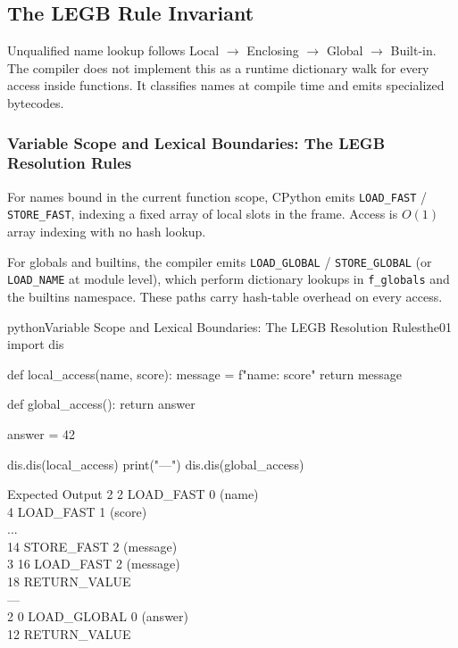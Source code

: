 \subsection{The LEGB Rule Invariant}

Unqualified name lookup follows Local $\rightarrow$ Enclosing $\rightarrow$ Global $\rightarrow$ Built-in. The compiler does not implement this as a runtime dictionary walk for every access inside functions. It classifies names at compile time and emits specialized bytecodes.

\subsubsection{Variable Scope and Lexical Boundaries: The LEGB Resolution Rules}

For names bound in the current function scope, CPython emits \texttt{LOAD\_FAST} / \texttt{STORE\_FAST}, indexing a fixed array of local slots in the frame. Access is $O(1)$ array indexing with no hash lookup.

For globals and builtins, the compiler emits \texttt{LOAD\_GLOBAL} / \texttt{STORE\_GLOBAL} (or \texttt{LOAD\_NAME} at module level), which perform dictionary lookups in \texttt{f\_globals} and the builtins namespace. These paths carry hash-table overhead on every access.

\begin{codebox}[]{python}{Variable Scope and Lexical Boundaries: The LEGB Resolution Rules}{the01}
import dis

def local_access(name, score):
    message = f"{name}: {score}"
    return message

def global_access():
    return answer

answer = 42

dis.dis(local_access)
print("---")
dis.dis(global_access)
\end{codebox}


\begin{iobox}{Expected Output}
  2           2 LOAD\_FAST                0 (name) \\
              4 LOAD\_FAST                1 (score) \\
             ... \\
             14 STORE\_FAST               2 (message) \\
  3          16 LOAD\_FAST                2 (message) \\
             18 RETURN\_VALUE \\
--- \\
  2           0 LOAD\_GLOBAL              0 (answer) \\
             12 RETURN\_VALUE \\
\end{iobox}




